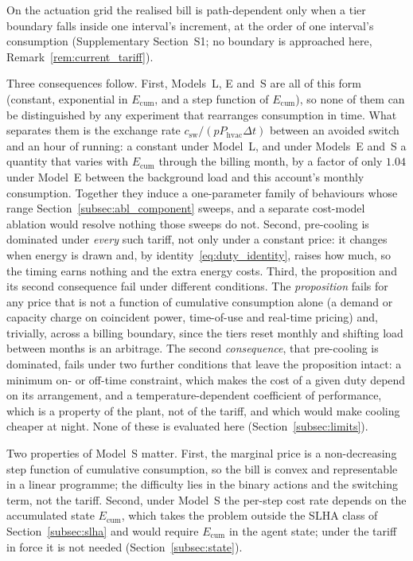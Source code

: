 \documentclass[3p,twocolumn,number]{elsarticle}
\newcommand{\csw}{c_{\mathrm{sw}}}
\newcommand{\Phvac}{P_{\mathrm{hvac}}}
\begin{document}
On the actuation grid the realised bill is path-dependent only when a tier boundary falls inside one interval's increment, at the order of one interval's consumption (Supplementary Section~S1; no boundary is approached here, Remark~\ref{rem:current_tariff}).

Three consequences follow. First, Models~L, E and~S are all of this form (constant, exponential in $E_{\mathrm{cum}}$, and a step function of $E_{\mathrm{cum}}$), so none of them can be distinguished by any experiment that rearranges consumption in time. What separates them is the exchange rate $\csw/(p\Phvac\Delta t)$ between an avoided switch and an hour of running: a constant under Model~L, and under Models~E and~S a quantity that varies with $E_{\mathrm{cum}}$ through the billing month, by a factor of only $1.04$ under Model~E between the background load and this account's monthly consumption. Together they induce a one-parameter family of behaviours whose range Section~\ref{subsec:abl_component} sweeps, and a separate cost-model ablation would resolve nothing those sweeps do not. Second, pre-cooling is dominated under \emph{every} such tariff, not only under a constant price: it changes when energy is drawn and, by identity~\eqref{eq:duty_identity}, raises how much, so the timing earns nothing and the extra energy costs. Third, the proposition and its second consequence fail under different conditions. The \emph{proposition} fails for any price that is not a function of cumulative consumption alone (a demand or capacity charge on coincident power, time-of-use and real-time pricing) and, trivially, across a billing boundary, since the tiers reset monthly and shifting load between months is an arbitrage. The second \emph{consequence}, that pre-cooling is dominated, fails under two further conditions that leave the proposition intact: a minimum on- or off-time constraint, which makes the cost of a given duty depend on its arrangement, and a temperature-dependent coefficient of performance, which is a property of the plant, not of the tariff, and which would make cooling cheaper at night. None of these is evaluated here (Section~\ref{subsec:limits}).

Two properties of Model~S matter. First, the marginal price is a non-decreasing step function of cumulative consumption, so the bill is convex and representable in a linear programme; the difficulty lies in the binary actions and the switching term, not the tariff. Second, under Model~S the per-step cost rate depends on the accumulated state $E_{\mathrm{cum}}$, which takes the problem outside the SLHA class of Section~\ref{subsec:slha} and would require $E_{\mathrm{cum}}$ in the agent state; under the tariff in force it is not needed (Section~\ref{subsec:state}).
\end{document}
